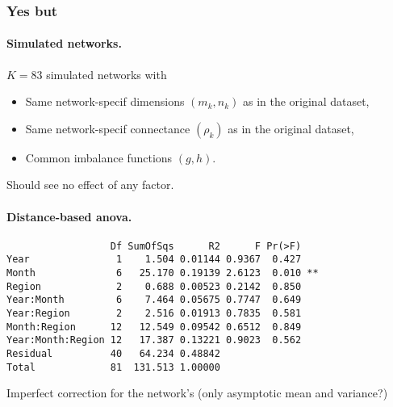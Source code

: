 \documentclass[8pt]{beamer}
\begin{document}
\begin{frame}[fragile] \frametitle{Yes but}

  \paragraph{Simulated networks.} $K = 83$ simulated networks with
  \begin{itemize}
    \item Same network-specif dimensions $(m_k, n_k)$ as in the original dataset,
    \item Same network-specif connectance $(\rho_k)$ as in the original dataset,
    \item Common imbalance functions $(g, h)$.
  \end{itemize}
  \ra Should see no effect of any factor.
  
  \bigskip \pause
  \paragraph{Distance-based anova.}   
\begin{verbatim}
                  Df SumOfSqs      R2      F Pr(>F)   
Year               1    1.504 0.01144 0.9367  0.427   
Month              6   25.170 0.19139 2.6123  0.010 **
Region             2    0.688 0.00523 0.2142  0.850   
Year:Month         6    7.464 0.05675 0.7747  0.649   
Year:Region        2    2.516 0.01913 0.7835  0.581   
Month:Region      12   12.549 0.09542 0.6512  0.849   
Year:Month:Region 12   17.387 0.13221 0.9023  0.562   
Residual          40   64.234 0.48842                 
Total             81  131.513 1.00000                 
\end{verbatim}

  \bigskip \pause
  \ra Imperfect correction for the network's  (only asymptotic mean and variance?)

\end{frame}
\end{document}
